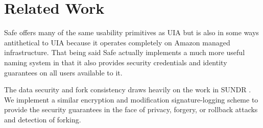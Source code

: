 \section{Related Work}
\label{sec:related}

Safe offers many of the same usability primitives as UIA \cite{uia} but is also in some ways antithetical to UIA because it operates completely on Amazon managed infrastructure. That being said Safe actually implements a much more useful naming system in that it also provides security credentials and identity guarantees on all users available to it.

The data security and fork consistency draws heavily on the work in SUNDR \cite{sundr}. We implement a similar encryption and modification signature-logging scheme to provide the security guarantees in the face of privacy, forgery, or rollback attacks and detection of forking. 